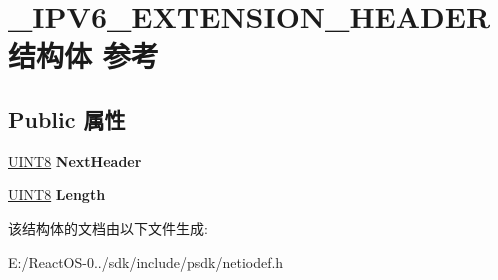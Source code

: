 \hypertarget{struct___i_p_v6___e_x_t_e_n_s_i_o_n___h_e_a_d_e_r}{}\section{\+\_\+\+I\+P\+V6\+\_\+\+E\+X\+T\+E\+N\+S\+I\+O\+N\+\_\+\+H\+E\+A\+D\+E\+R结构体 参考}
\label{struct___i_p_v6___e_x_t_e_n_s_i_o_n___h_e_a_d_e_r}
\subsection*{Public 属性}
\begin{DoxyCompactItemize}
\item 
\mbox{\label{struct___i_p_v6___e_x_t_e_n_s_i_o_n___h_e_a_d_e_r_ac81ea1c72bc215a1c8a4a4bfc275c7d8}} 
\hyperlink{_processor_bind_8h_ab27e9918b538ce9d8ca692479b375b6a}{U\+I\+N\+T8} {\bfseries Next\+Header}
\item 
\mbox{\label{struct___i_p_v6___e_x_t_e_n_s_i_o_n___h_e_a_d_e_r_ae4acdfb18213c3d571f9b3deb46fd3d2}} 
\hyperlink{_processor_bind_8h_ab27e9918b538ce9d8ca692479b375b6a}{U\+I\+N\+T8} {\bfseries Length}
\end{DoxyCompactItemize}


该结构体的文档由以下文件生成\+:\begin{DoxyCompactItemize}
\item 
E\+:/\+React\+O\+S-\/0../sdk/include/psdk/netiodef.\+h\end{DoxyCompactItemize}
